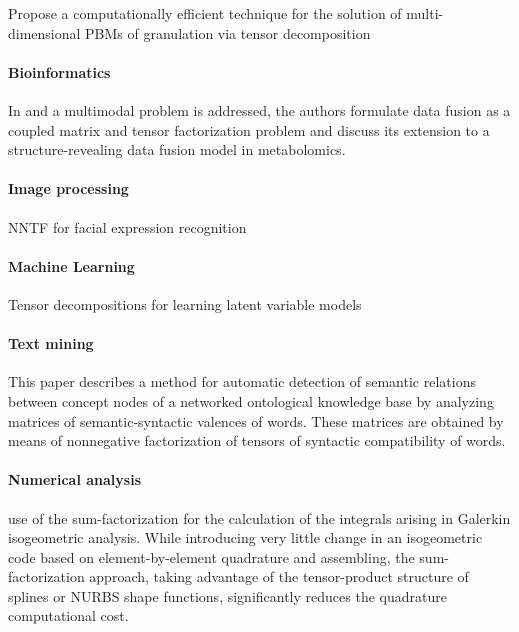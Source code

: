 \documentclass[letterpaper,12pt]{article}
\begin{document}
\cite{Chaudhury2014} Propose a computationally efficient technique for the solution of multi-dimensional PBMs of granulation via tensor decomposition

\paragraph{Bioinformatics}

In \cite{Acar2015} and \cite{Acar2014} a multimodal problem is addressed, the authors formulate data fusion as a coupled matrix and tensor factorization problem and discuss its extension to a structure-revealing data fusion model in metabolomics.


\paragraph{Image processing}

\cite{An2015} NNTF for facial expression recognition


\paragraph{Machine Learning}

\cite{Anandkumar2012} Tensor decompositions for learning latent variable models

\paragraph{Text mining}

\cite{Anisimov2014} This paper describes a method for automatic detection of semantic relations between concept nodes of a networked ontological knowledge base by analyzing matrices of semantic-syntactic valences of words. These matrices are obtained by means of nonnegative factorization of tensors of syntactic compatibility of words. 


\paragraph{Numerical analysis}
 
\cite{Antolin2015} use of the sum-factorization for the calculation of the integrals arising in Galerkin isogeometric analysis. While introducing very little change in an isogeometric code based on element-by-element quadrature and assembling, the sum-factorization approach, taking advantage of the tensor-product structure of splines or NURBS shape functions, significantly reduces the quadrature computational cost.
\end{document}

